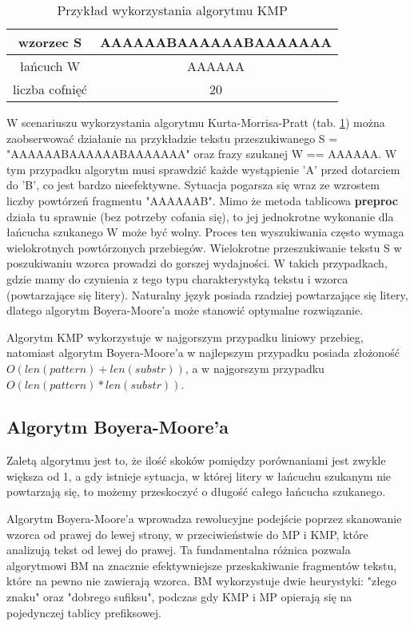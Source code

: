 \begin{table}
  \centering
  \begin{tabular}{ |c|c|  } 
    \hline
    wzorzec S & AAAAAABAAAAAABAAAAAAA \\
    \hline
    łańcuch W & AAAAAA \\
    \hline
    liczba cofnięć & 20 \\
    \hline
  \end{tabular}
  \caption{Przykład wykorzystania algorytmu KMP}
  \label{tabela:KMPExampleSlow}
\end{table}

W scenariuszu wykorzystania algorytmu Kurta-Morrisa-Pratt (tab. \ref{tabela:KMPExampleSlow})
można zaobserwować działanie na przykładzie tekstu przeszukiwanego S = 
"AAAAAABAAAAAABAAAAAAA" oraz frazy szukanej W == AAAAAA. W tym przypadku algorytm musi sprawdzić każde
wystąpienie 'A' przed dotarciem do 'B', co jest bardzo nieefektywne. Sytuacja 
pogarsza się wraz ze wzrostem liczby powtórzeń fragmentu "AAAAAAB". Mimo że 
metoda tablicowa \textbf{preproc} działa tu sprawnie (bez potrzeby cofania się), to jej 
jednokrotne wykonanie dla łańcucha szukanego W może być wolny. Proces
ten wyszukiwania często wymaga wielokrotnych powtórzonych przebiegów. 
Wielokrotne przeszukiwanie tekstu S w poszukiwaniu wzorca prowadzi do gorszej
wydajności. W takich przypadkach, gdzie mamy do czynienia z tego typu 
charakterystyką tekstu i wzorca (powtarzające się litery). Naturalny język posiada
rzadziej powtarzające się litery, dlatego algorytm Boyera-Moore'a może stanowić 
optymalne rozwiązanie.

Algorytm KMP wykorzystuje w najgorszym przypadku liniowy przebieg, natomiast
algorytm Boyera-Moore'a w najlepszym przypadku posiada złożoność $O({len(pattern)}+{len(substr)})$, a w 
najgorszym przypadku $O({len(pattern)}*{len(substr)})$.

\subsection{Algorytm Boyera-Moore'a}
\label{sch:algoBoyerMoore}

Zaletą algorytmu jest to, że ilość skoków pomiędzy porównaniami jest zwykle 
większa od 1, a gdy istnieje sytuacja, w której litery w łańcuchu szukanym nie
powtarzają się, to możemy przeskoczyć o długość całego łańcucha szukanego.

Algorytm Boyera-Moore'a wprowadza rewolucyjne podejście poprzez skanowanie 
wzorca od prawej do lewej strony, w przeciwieństwie do MP i KMP, które 
analizują tekst od lewej do prawej. Ta fundamentalna różnica pozwala algorytmowi BM na 
znacznie efektywniejsze przeskakiwanie fragmentów tekstu, które na pewno nie 
zawierają wzorca. BM wykorzystuje dwie heurystyki: "złego znaku" oraz "dobrego
sufiksu", podczas gdy KMP i MP opierają się na pojedynczej tablicy prefiksowej.

